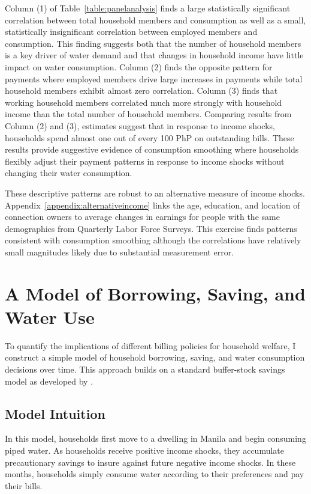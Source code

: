 \documentclass[12pt]{article}
\begin{document}
Column (1) of Table~\ref{table:panelanalysis} finds a large statistically significant correlation between total household members and consumption as well as a small, statistically insignificant correlation between employed members and consumption.  This finding suggests both that the number of household members is a key driver of water demand and that changes in household income have little impact on water consumption.  Column (2) finds the opposite pattern for payments where employed members drive large increases in payments while total household members exhibit almost zero correlation.  Column (3) finds that working household members correlated much more strongly with household income than the total number of household members.  Comparing results from Column (2) and (3), estimates suggest that in response to income shocks, households spend almost one out of every 100 PhP on outstanding bills.  These results provide suggestive evidence of consumption smoothing where households flexibly adjust their payment patterns in response to income shocks without changing their water consumption.  

These descriptive patterns are robust to an alternative measure of income shocks.  Appendix~\ref{appendix:alternativeincome} links the age, education, and location of connection owners to average changes in earnings for people with the same demographics from Quarterly Labor Force Surveys.  This exercise finds patterns consistent with consumption smoothing although the correlations have relatively small magnitudes likely due to substantial measurement error.

\section{A Model of Borrowing, Saving, and Water Use}\label{section:model}

To quantify the implications of different billing policies for household welfare, I construct a simple model of household borrowing, saving, and water consumption decisions over time.  This approach builds on a standard buffer-stock savings model as developed by \cite{deaton1991saving}.

\subsection{Model Intuition}

In this model, households first move to a dwelling in Manila and begin consuming piped water.  As households receive positive income shocks, they accumulate precautionary savings to insure against future negative income shocks.  In these months, households simply consume water according to their preferences and pay their bills.
\end{document}

